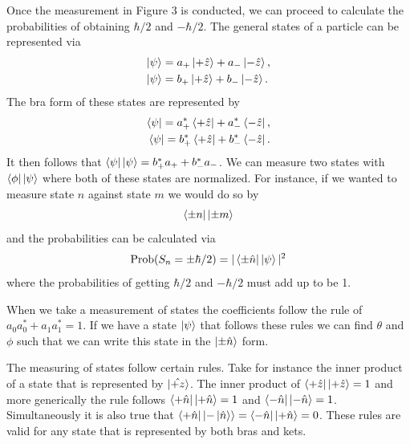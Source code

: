 \documentclass[twocolumn]{article}
\begin{document}
\newline
Once the measurement in Figure 3 is conducted, we can proceed to calculate the probabilities of obtaining $\hbar/2$ and $-\hbar/2$. The general states of a particle can be represented via
\begin{align} \label{eq:1}
\ket{\psi}&=a_{+}\ket{+\hat{z}}+a_{-}\ket{-\hat{z}}, \\
\ket{\psi}&=b_{+}\ket{+\hat{z}}+b_{-}\ket{-\hat{z}}. \nonumber
\end{align}
The bra form of these states are represented by
\begin{align}\label{eq:2}
\bra{\psi}=a_{+}^*\bra{+\hat{z}}+a_{-}^*\bra{-\hat{z}}, \\
\bra{\psi}=b_{+}^*\bra{+\hat{z}}+b_{-}^*\bra{-\hat{z}}. \nonumber
\end{align}
It then follows that $\bra{\psi}\ket{\psi}=b_{+}^*a_{+}+b_{-}^*a_{-}$. We can measure two states with $\bra{\phi}\ket{\psi}$ where both of these states are normalized. For instance, if we wanted to measure state $n$ against state $m$ we would do so by
\begin{equation} \label{eq:3}
\bra{\pm n}\ket{\pm m}
\end{equation}
and the probabilities can be calculated via
\begin{equation} \label{eq:4}
\text{Prob}(S_n=\pm \hbar/2)=|\bra{\pm\hat{n}}\ket{\psi}|^2
\end{equation}
where the probabilities of getting $\hbar/2$ and $-\hbar/2$ must add up to be 1. 

When we take a measurement of states the coefficients follow the rule of $a_0a_0^*+a_1a_1^*=1$. If we have a state $\ket{\psi}$ that follows these rules we can find $\theta$ and $\phi$ such that we can write this state in the $\ket{\pm\hat{n}}$ form. 

The measuring of states follow certain rules. Take for instance the inner product of a state that is represented by $\ket{\hat{+z}}$. The inner product of $\bra{+\hat{z}}\ket{+\hat{z}}=1$ and more generically the rule follows $\bra{+\hat{n}}\ket{+\hat{n}}=1$ and $\bra{-\hat{n}}\ket{-\hat{n}}=1$. Simultaneously it is also true that $\bra{+\hat{n}}\ket{-\ket{\hat{n}}}=\bra{-\hat{n}}\ket{+\hat{n}}=0$. These rules are valid for any state that is represented by both bras and kets.
\end{document}

